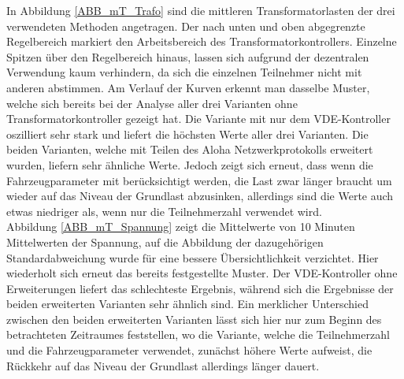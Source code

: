 In Abbildung \ref{ABB_mT_Trafo} sind die mittleren Transformatorlasten der drei verwendeten Methoden angetragen. Der nach unten und oben abgegrenzte Regelbereich markiert den Arbeitsbereich des Transformatorkontrollers. Einzelne Spitzen über den Regelbereich hinaus, lassen sich aufgrund der dezentralen Verwendung kaum verhindern, da sich die einzelnen Teilnehmer nicht mit anderen abstimmen. Am Verlauf der Kurven erkennt man dasselbe Muster, welche sich bereits bei der Analyse aller drei Varianten ohne Transformatorkontroller gezeigt hat. Die Variante mit nur dem VDE-Kontroller oszilliert sehr stark und liefert die höchsten Werte aller drei Varianten. Die beiden Varianten, welche mit Teilen des Aloha Netzwerkprotokolls erweitert wurden, liefern sehr ähnliche Werte. Jedoch zeigt sich erneut, dass wenn die Fahrzeugparameter mit berücksichtigt werden, die Last zwar länger braucht um wieder auf das Niveau der Grundlast abzusinken, allerdings sind die Werte auch etwas niedriger als, wenn nur die Teilnehmerzahl verwendet wird.\\
Abbildung \ref{ABB_mT_Spannung} zeigt die Mittelwerte von 10 Minuten Mittelwerten der Spannung, auf die Abbildung der dazugehörigen Standardabweichung wurde für eine bessere Übersichtlichkeit verzichtet. Hier wiederholt sich erneut das bereits festgestellte Muster. Der VDE-Kontroller ohne Erweiterungen liefert das schlechteste Ergebnis, während sich die Ergebnisse der beiden erweiterten Varianten sehr ähnlich sind. Ein merklicher Unterschied zwischen den beiden erweiterten Varianten lässt sich hier nur zum Beginn des betrachteten Zeitraumes feststellen, wo die Variante, welche die Teilnehmerzahl und die Fahrzeugparameter verwendet, zunächst höhere Werte aufweist, die Rückkehr auf das Niveau der Grundlast allerdings länger dauert.\\
